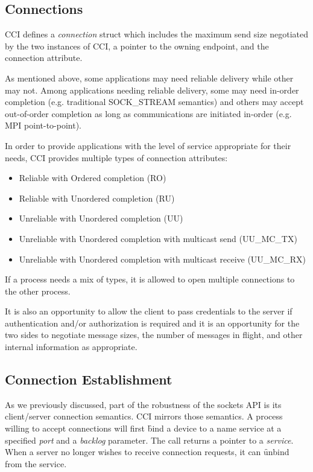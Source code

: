 \documentclass[conference]{IEEEtran}
\begin{document}
\subsection{Connections}
CCI defines a \emph{connection} struct which includes the maximum send size negotiated by
the two instances of CCI, a pointer to the owning endpoint, and the connection attribute.

As mentioned above, some applications may need reliable delivery while other may not.
Among applications needing reliable delivery, some may need in-order completion (e.g.
traditional SOCK\_STREAM semantics) and others may accept out-of-order completion as long
as communications are initiated in-order (e.g. MPI point-to-point).

In order to provide applications with the level of service appropriate for their needs,
CCI provides multiple types of connection attributes:

\begin{itemize}
\item Reliable with Ordered completion (RO)
\item Reliable with Unordered completion (RU)
\item Unreliable with Unordered completion (UU)
\item Unreliable with Unordered completion with multicast send (UU\_MC\_TX)
\item Unreliable with Unordered completion with multicast receive (UU\_MC\_RX)
\end{itemize}

If a process needs a mix of types, it is allowed to open multiple connections to the other
process.

It is also an opportunity to allow the client to pass credentials to the
server if authentication and/or authorization is required and it is an opportunity for the
two sides to negotiate message sizes, the number of messages in flight, and other internal
information as appropriate.

\subsection{Connection Establishment}
As we previously discussed, part of the robustness of the sockets API is its client/server
connection semantics. CCI mirrors those semantics. A process willing to accept connections
will first \f{bind} a device to a name service at a specified \emph{port} and a
\emph{backlog} parameter. The call returns a pointer to a \emph{service}. When a server no
longer wishes to receive connection requests, it can \f{unbind} from the service.
\end{document}
